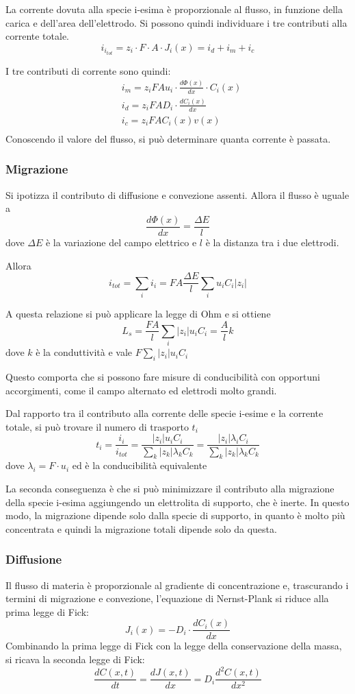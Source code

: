 La corrente dovuta alla specie i-esima è proporzionale al flusso, in funzione della carica e dell'area dell'elettrodo.
Si possono quindi individuare i tre contributi alla corrente totale.
\[
i_{i_{tot}} = z_i \cdot F \cdot A \cdot J_i (x) = i_d + i_m + i_c 
\]

I tre contributi di corrente sono quindi:
\begin{align*}
& i_m = z_i F A u_i \cdot \frac{d \Phi (x)}{dx} \cdot C_i (x)\\
& i_d = z_i F A D_i \cdot \frac{d C_i (x)}{dx}\\
& i_c = z_i F A C_i (x) v (x)\\
\end{align*}
Conoscendo il valore del flusso, si può determinare quanta corrente è passata.


\subsubsection{Migrazione}
Si ipotizza il contributo di diffusione e convezione assenti.
Allora il flusso è uguale a
\[
\frac{d \Phi (x)}{dx} = \frac{\Delta E}{l}
\]
dove $\Delta E$ è la variazione del campo elettrico e $l$ è la distanza tra i due elettrodi.

Allora
\[
i_{tot} = \sum_i i_i = F A \frac{\Delta E}{l} \sum_i u_i C_i |z_i|
\]

A questa relazione si può applicare la legge di Ohm e si ottiene
\[
L_s = \frac{F A }{l} \sum_i |z_i| u_i C_i = \frac{A}{l} k
\]
dove $k$ è la conduttività e vale $F \sum_i |z_i| u_i C_i$

Questo comporta che si possono fare misure di conducibilità con opportuni accorgimenti, come il campo alternato ed elettrodi molto grandi.

Dal rapporto tra il contributo alla corrente delle specie i-esime e la corrente totale, si può trovare il numero di trasporto $t_i$
\[
t_i = \frac{i_i}{i_{tot}} = \frac{|z_i| u_i C_i}{\sum_k |z_k| \lambda_k C_k} = \frac{|z_i| \lambda_i C_i}{\sum_k |z_k| \lambda_k C_k}
\]
dove $\lambda_i = F \cdot u_i$ ed è la conducibilità equivalente

La seconda conseguenza è che si può minimizzare il contributo alla migrazione della specie i-esima aggiungendo un elettrolita di supporto, che è inerte.
In questo modo, la migrazione dipende solo dalla specie di supporto, in quanto è molto più concentrata e quindi la migrazione totali dipende solo da questa.

\subsubsection{Diffusione}
Il flusso di materia è proporzionale al gradiente di concentrazione e, trascurando i termini di migrazione e convezione, l'equazione di Nernst-Plank si riduce alla prima legge di Fick:
\[
J_i (x) = -D_i \cdot \frac{d C_i (x)}{dx}
\]
Combinando la prima legge di Fick con la legge della conservazione della massa, si ricava la seconda legge di Fick:
\[
\frac{d C (x,t)}{dt} = \frac{d J (x,t)}{dx} = D_i \frac{d^2 C (x,t)}{dx^2}
\]

